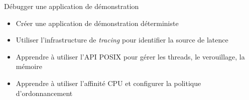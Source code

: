 {Débugger une application de démonstration}
{
  \begin{itemize}
  \item Créer une application de démonstration déterministe
  \item Utiliser l'infrastructure de {\em tracing} pour identifier la source de latence
  \item Apprendre à utiliser l'API POSIX pour gérer les threads, le verouillage, la mémoire
  \item Apprendre à utiliser l'affinité CPU et configurer la politique d'ordonnancement
  \end{itemize}
}

\def \agendaboards{stm32mp1}

\def \onlineagenda {
  \ifthenelse{\equal{\agendalanguage}{french}}{
    \section{Programme de la formation}
  }{
    \section{Training Schedule}
  }
  \begin{tabularx}{\textwidth}{p{2cm}p{5cm}p{11cm}}
  \showagendaday{1}
  \showagendaitem{intro}{lecture}
  \showagendaitem{preemptrtpatch}{lecture}
  \showagendaitem{buildkernel}{lab}
  \showagendaitem{configuration}{lecture}
  \showagendaday{2}
  \showagendaitem{tools}{lecture}
  \showagendaitem{tools}{lab}
  \showagendaitem{kernelinfrastructure}{lecture}
  \showagendaday{3}
  \showagendaitem{realtime}{lecture}
  \showagendaitem{debug}{lab}
  \end{tabularx}
}
\def \onsiteagenda {
  \ifthenelse{\equal{\agendalanguage}{french}}{
    \section{Programme de la formation}
  }{
    \section{Training Schedule}
  }
  \begin{tabularx}{\textwidth}{p{2cm}p{5cm}p{11cm}}
  \showagendaday{1}
  \showagendaitem{intro}{lecture}
  \showagendaitem{preemptrtpatch}{lecture}
  \showagendaitem{buildkernel}{lab}
  \showagendaday{2}
  \showagendaitem{configuration}{lecture}
  \showagendaitem{tools}{lecture}
  \showagendaitem{tools}{lab}
  \showagendaday{3}
  \showagendaitem{kernelinfrastructure}{lecture}
  \showagendaitem{realtime}{lecture}
  \showagendaday{4}
  \showagendaitem{debug}{lab}
  \end{tabularx}
}
